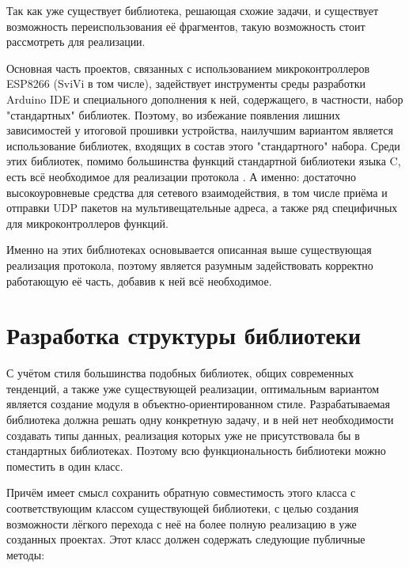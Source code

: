 Так как уже существует библиотека, решающая схожие задачи, и существует возможность переиспользования её фрагментов, такую возможность стоит рассмотреть для реализации.

Основная часть проектов, связанных с использованием микроконтроллеров ESP8266 (SviVi в том числе), задействует инструменты среды разработки Arduino IDE и специального дополнения к ней, содержащего, в частности, набор "стандартных" библиотек.
Поэтому, во избежание появления лишних зависимостей у итоговой прошивки устройства, наилучшим вариантом является использование библиотек, входящих в состав этого "стандартного" набора.
Среди этих библиотек, помимо большинства функций стандартной библиотеки языка C, есть всё необходимое для реализации протокола \cite{bib:arduino-library}.
А именно: достаточно высокоуровневые средства для сетевого взаимодействия, в том числе приёма и отправки UDP пакетов на мультивещательные адреса, а также ряд специфичных для микроконтроллеров функций.

Именно на этих библиотеках основывается описанная выше существующая реализация протокола, поэтому является разумным задействовать корректно работающую её часть, добавив к ней всё необходимое.

\section{Разработка структуры библиотеки}

С учётом стиля большинства подобных библиотек, общих современных тенденций, а также уже существующей реализации, оптимальным вариантом является создание модуля в объектно-ориентированном стиле.
Разрабатываемая библиотека должна решать одну конкретную задачу, и в ней нет необходимости создавать типы данных, реализация которых уже не присутствовала бы в стандартных библиотеках.
Поэтому всю функциональность библиотеки можно поместить в один класс.

Причём имеет смысл сохранить обратную совместимость этого класса с соответствующим классом существующей библиотеки, с целью создания возможности лёгкого перехода с неё на более полную реализацию в уже созданных проектах.
Этот класс должен содержать следующие публичные методы:

